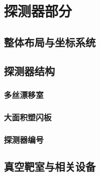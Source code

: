 \chapter{探测器部分}

\section{整体布局与坐标系统}


\section{探测器结构}
\subsection{多丝漂移室}

\subsection{大面积塑闪板}

\subsection{探测器编号}

\section{真空靶室与相关设备}

